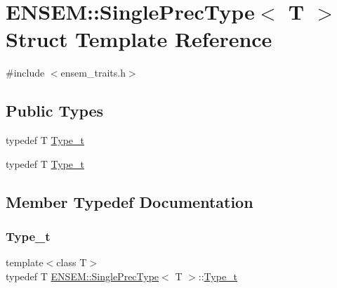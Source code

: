 \hypertarget{structENSEM_1_1SinglePrecType}{}\section{E\+N\+S\+EM\+:\+:Single\+Prec\+Type$<$ T $>$ Struct Template Reference}
\label{structENSEM_1_1SinglePrecType}


{\ttfamily \#include $<$ensem\+\_\+traits.\+h$>$}

\subsection*{Public Types}
\begin{DoxyCompactItemize}
\item 
typedef T \mbox{\hyperlink{structENSEM_1_1SinglePrecType_ab7ef789d62d59167eff4df3cc221c4e1}{Type\+\_\+t}}
\item 
typedef T \mbox{\hyperlink{structENSEM_1_1SinglePrecType_ab7ef789d62d59167eff4df3cc221c4e1}{Type\+\_\+t}}
\end{DoxyCompactItemize}


\subsection{Member Typedef Documentation}
\mbox{\label{structENSEM_1_1SinglePrecType_ab7ef789d62d59167eff4df3cc221c4e1}} 
\subsubsection{\texorpdfstring{Type\_t}{Type\_t}\hspace{0.1cm}{\footnotesize\ttfamily [1/2]}}
{\footnotesize\ttfamily template$<$class T$>$ \\
typedef T \mbox{\hyperlink{structENSEM_1_1SinglePrecType}{E\+N\+S\+E\+M\+::\+Single\+Prec\+Type}}$<$ T $>$\+::\mbox{\hyperlink{structENSEM_1_1SinglePrecType_ab7ef789d62d59167eff4df3cc221c4e1}{Type\+\_\+t}}}

\mbox{\label{structENSEM_1_1SinglePrecType_ab7ef789d62d59167eff4df3cc221c4e1}} 
